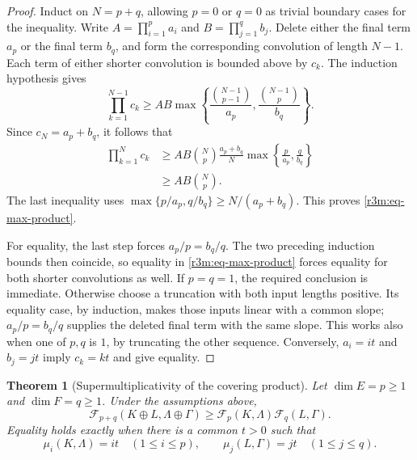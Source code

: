 \documentclass[11pt,a4paper]{article}
\newtheorem{theorem}{Theorem}[section]
\theoremstyle{remark}\newtheorem{remark}[theorem]{Remark}
\begin{document}
\begin{proof}
Induct on $N=p+q$, allowing $p=0$ or $q=0$ as trivial boundary
cases for the inequality.  Write
$A=\prod_{i=1}^p a_i$ and $B=\prod_{j=1}^q b_j$.
Delete either the final term $a_p$ or the final term $b_q$, and
form the corresponding convolution of length $N-1$.
Each term of either shorter convolution is bounded above by $c_k$.
The induction hypothesis gives
\[
 \prod_{k=1}^{N-1}c_k
 \ge AB\max\left\{
          \frac{\binom{N-1}{p-1}}{a_p},
          \frac{\binom{N-1}{p}}{b_q}
               \right\}.
\]
Since $c_N=a_p+b_q$, it follows that
\begin{align*}
 \prod_{k=1}^{N}c_k
 &\ge AB\binom Np
       \frac{a_p+b_q}{N}
       \max\left\{\frac p{a_p},\frac q{b_q}\right\}\\
 &\ge AB\binom Np.
\end{align*}
The last inequality uses
$\max\{p/a_p,q/b_q\}\ge N/(a_p+b_q)$.
This proves \eqref{r3m:eq-max-product}.

For equality, the last step forces $a_p/p=b_q/q$.
The two preceding induction bounds then coincide, so equality in
\eqref{r3m:eq-max-product} forces equality for both shorter
convolutions as well.  If $p=q=1$, the required conclusion is
immediate.  Otherwise choose a truncation with both input lengths
positive.  Its equality case, by induction, makes those inputs
linear with a common slope; $a_p/p=b_q/q$ supplies the deleted final
term with the same slope.  This works also when one of $p,q$ is $1$,
by truncating the other sequence.
Conversely, $a_i=it$ and $b_j=jt$ imply $c_k=kt$ and give equality.
\end{proof}

\begin{theorem}[Supermultiplicativity of the covering product]
\label{r3m:thm-product-closure}
Let $\dim E=p\ge1$ and $\dim F=q\ge1$.  Under the assumptions above,
\begin{equation}
\label{r3m:eq-supermultiplicativity}
 \mathcal F_{p+q}(K\oplus L,\Lambda\oplus\Gamma)
 \ge \mathcal F_p(K,\Lambda)\mathcal F_q(L,\Gamma).
\end{equation}
Equality holds exactly when there is a common $t>0$ such that
\[
 \mu_i(K,\Lambda)=it\quad(1\le i\le p),
 \qquad
 \mu_j(L,\Gamma)=jt\quad(1\le j\le q).
\]
\end{theorem}
\end{document}
